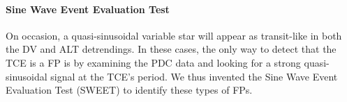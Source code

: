 

%





\paragraph{Sine Wave Event Evaluation Test}
\label{sweetntlsec}

On occasion, a quasi-sinusoidal variable star will appear as transit-like in both the DV and ALT detrendings. In these cases, the only way to detect that the TCE is a FP is by examining the PDC data and looking for a strong quasi-sinusoidal signal at the TCE's period. We thus invented the Sine Wave Event Evaluation Test (SWEET) to identify these types of FPs.

